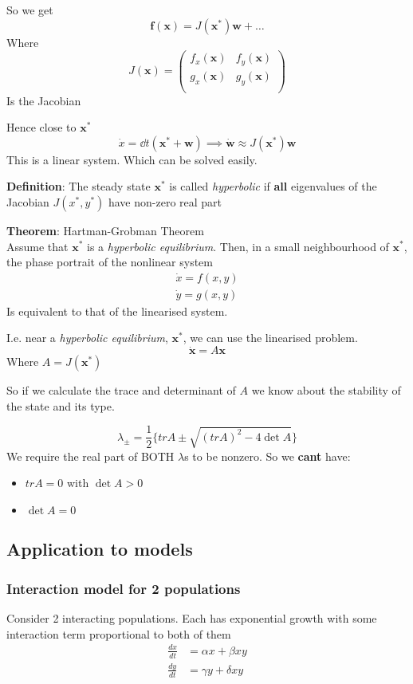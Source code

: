 \documentclass{/home/janmebows/Documents/LatexTemplates/myassignment}
\begin{document}
So we get
\[\mathbf{f}(\mathbf{x}) = J(\mathbf{x}^*)\mathbf{w} + \ldots\]
Where 
\[J(\mathbf{x}) = \begin{pmatrix}
    f_x(\mathbf{x})&f_y(\mathbf{x})\\
    g_x(\mathbf{x})&g_y(\mathbf{x})\\
\end{pmatrix}\]
Is the Jacobian

Hence close to $\mathbf{x}^*$
\[\dot x = \dd{}t(\mathbf{x}^* + \mathbf{w}) \implies \dot{\mathbf{w}} \approx J(\mathbf{x}^*)\mathbf{w}\]
This is a linear system. Which can be solved easily.


\textbf{Definition}:
The steady state $\mathbf{x}^*$ is called \textit{hyperbolic} if \textbf{all} eigenvalues of the Jacobian $J(x^*,y^*)$ have non-zero real part

\textbf{Theorem}: Hartman-Grobman Theorem\\
Assume that $\mathbf{x}^*$ is a \textit{hyperbolic equilibrium}. Then, in a small neighbourhood of $\mathbf{x}^*$, the phase portrait of the nonlinear system
\begin{align*}
    \dot x = f(x,y)\\
    \dot y = g(x,y)
\end{align*}
Is equivalent to that of the linearised system.

I.e. near a \textit{hyperbolic equilibrium}, $\mathbf{x^*}$, we can use the linearised problem.
\[\dot{\mathbf{x}} = A \mathbf{x} \]
Where $A = J(\mathbf{x}^*)$

So if we calculate the trace and determinant of $A$ we know about the stability of the state and its type.

\[\lambda_\pm = \frac12 \{tr A \pm \sqrt{(tr A)^2 - 4\det A}\} \]
We require the real part of BOTH $\lambda$s to be nonzero. 
So we \textbf{cant} have:
\begin{itemize}
    \item  $tr A = 0$  with $\det A >0$
    \item $\det A = 0$ 
\end{itemize}


\subsection{Application to models}
\subsubsection{Interaction model for 2 populations}
Consider 2 interacting populations. Each has exponential growth with some interaction term proportional to both of them
\begin{align*}
    \frac{dx}{dt} &= \alpha x + \beta xy\\
    \frac{dy}{dt} &= \gamma y + \delta xy
\end{align*}
\end{document}
